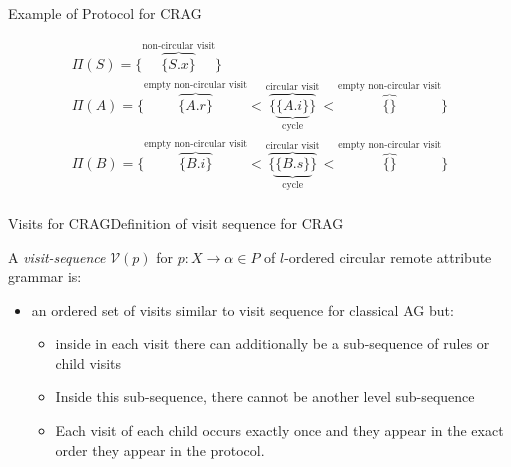\begin{frame}{Example of Protocol for CRAG}

\begin{equation}\label{eq:protocol-for-crag-example}
\begin{gathered}
\Pi(S) =  \Big \{   \overbrace{\{ S.x \} }^{\text{non-circular visit}}     \Big \} \\
\Pi(A) =  \Big \{  
\overbrace{\big \{  A.r  \big \}}^{\text{empty non-circular visit}} <
\overbrace{\big \{  \underbrace{  \{  A.i  \}}_{\text{cycle}}  \big \}}^{\text{circular visit}} <
\overbrace{\big \{    \big \}}^{\text{empty non-circular visit}}
\Big \} \\
\Pi(B) =  \Big \{
\overbrace{\big \{   B.i  \big \}}^{\text{empty non-circular visit}} <
\overbrace{\big \{  \underbrace{  \{  B.s \}}_{\text{cycle}}  \big \}}^{\text{circular visit}} <
\overbrace{\big \{    \big \}}^{\text{empty non-circular visit}}
\Big \} \\
\end{gathered}
\end{equation}
    
\end{frame}


\begin{frame}{Visits for CRAG}{Definition of visit sequence for CRAG}

A \emph{visit-sequence} $\mathscr{V}(p)$ for $p{:} X \rightarrow \alpha \in P$ of $l$-ordered circular remote attribute grammar is:

\begin{itemize}
    \item an ordered set of visits similar to visit sequence for classical AG but:
    \begin{itemize}
        \item inside in each visit there can additionally be a sub-sequence of rules or child visits
        \item Inside this sub-sequence, there cannot be another level sub-sequence \item Each visit of each child occurs exactly once and they appear in the exact order they appear in the protocol.
    \end{itemize}
\end{itemize}

\end{frame}

